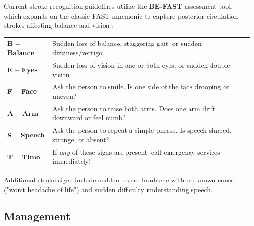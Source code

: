 Current stroke recognition guidelines utilize the \textbf{BE-FAST} assessment tool, which expands on the classic FAST mnemonic to capture posterior circulation strokes affecting balance and vision \cite{nih_stroke}:

\begin{center}
\begin{tabularx}{\textwidth}{@{}>{\raggedright\arraybackslash}l>{\raggedright\arraybackslash}X@{}}
\hline
\textbf{B -- Balance} & Sudden loss of balance, staggering gait, or sudden dizziness/vertigo \\
\textbf{E -- Eyes} & Sudden loss of vision in one or both eyes, or sudden double vision \\
\textbf{F -- Face} & Ask the person to smile. Is one side of the face drooping or uneven? \\
\textbf{A -- Arm} & Ask the person to raise both arms. Does one arm drift downward or feel numb? \\
\textbf{S -- Speech} & Ask the person to repeat a simple phrase. Is speech slurred, strange, or absent? \\
\textbf{T -- Time} & If \emph{any} of these signs are present, call emergency services immediately! \\
\hline
\end{tabularx}
\end{center}

Additional stroke signs include sudden severe headache with no known cause ("worst headache of life") and sudden difficulty understanding speech.

\subsection{Management}

